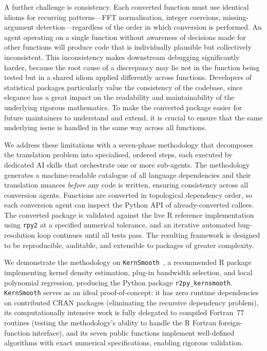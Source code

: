 \documentclass[12pt,a4paper]{article}
\newcommand{\pkg}[1]{\texttt{#1}}
\begin{document}
A further challenge is consistency. Each converted function must use identical idioms for recurring patterns---FFT normalisation, integer coercions, missing-argument detection---regardless of the order in which conversion is performed. An agent operating on a single function without awareness of decisions made for other functions will produce code that is individually plausible but collectively inconsistent. This inconsistency makes downstream debugging significantly harder, because the root cause of a discrepancy may lie not in the function being tested but in a shared idiom applied differently across functions. Developers of statistical packages particularly value the consistency of the codebase, since elegance has a great impact on the readability and maintainability of the underlying rigorous mathematics. To make the converted package easier for future maintainers to understand and extend, it is crucial to ensure that the same underlying issue is handled in the same way across all functions.

We address these limitations with a seven-phase methodology that decomposes the translation problem into specialised, ordered steps, each executed by dedicated AI skills that orchestrate one or more sub-agents. The methodology generates a machine-readable catalogue of all language dependencies and their translation nuances \textit{before} any code is written, ensuring consistency across all conversion agents. Functions are converted in topological dependency order, so each conversion agent can inspect the Python API of already-converted callees. The converted package is validated against the live R reference implementation using \pkg{rpy2} at a specified numerical tolerance, and an iterative automated bug-resolution loop continues until all tests pass. The resulting framework is designed to be reproducible, auditable, and extensible to packages of greater complexity.

We demonstrate the methodology on \pkg{KernSmooth}~\cite{wandjones1995}, a recommended R package implementing kernel density estimation, plug-in bandwidth selection, and local polynomial regression, producing the Python package \pkg{r2py\_kernsmooth}. \pkg{KernSmooth} serves as an ideal proof-of-concept: it has zero runtime dependencies on contributed CRAN packages (eliminating the recursive dependency problem), its computationally intensive work is fully delegated to compiled Fortran~77 routines (testing the methodology's ability to handle the R Fortran foreign-function interface), and its seven public functions implement well-defined algorithms with exact numerical specifications, enabling rigorous validation.
\end{document}
